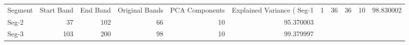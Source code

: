 \begin{tabular}{lrrrrr}
\toprule
Segment & Start Band & End Band & Original Bands & PCA Components & Explained Variance (%
\midrule
Seg-1 & 1 & 36 & 36 & 10 & 98.830002 \\
Seg-2 & 37 & 102 & 66 & 10 & 95.370003 \\
Seg-3 & 103 & 200 & 98 & 10 & 99.379997 \\
\bottomrule
\end{tabular}
